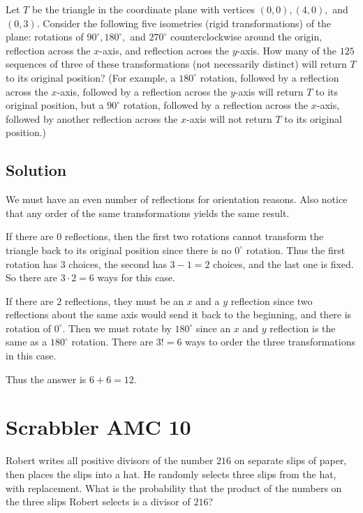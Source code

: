 \documentclass[mast]{lucky}
\begin{document}
Let $T$ be the triangle in the coordinate plane with vertices $(0,0), (4,0),$ and $(0,3).$ Consider the following five isometries (rigid transformations) of the plane: rotations of $90^{\circ}, 180^{\circ},$ and $270^{\circ}$ counterclockwise around the origin, reflection across the $x$-axis, and reflection across the $y$-axis. How many of the $125$ sequences of three of these transformations (not necessarily distinct) will return $T$ to its original position? (For example, a $180^{\circ}$ rotation, followed by a reflection across the $x$-axis, followed by a reflection across the $y$-axis will return $T$ to its original position, but a $90^{\circ}$ rotation, followed by a reflection across the $x$-axis, followed by another reflection across the $x$-axis will not return $T$ to its original position.)

\subsection{Solution}
We must have an even number of reflections for orientation reasons. Also notice that any order of the same transformations yields the same result.
    
If there are $0$ reflections, then the first two rotations cannot transform the triangle back to its original position since there is no $0^{\circ}$ rotation. Thus the first rotation has $3$ choices, the second has $3-1=2$ choices, and the last one is fixed. So there are $3\cdot 2=6$ ways for this case.
    
If there are $2$ reflections, they must be an $x$ and a $y$ reflection since two reflections about the same axis would send it back to the beginning, and there is rotation of $0^{\circ}.$ Then we must rotate by $180^{\circ}$ since an $x$ and $y$ reflection is the same as a $180^{\circ}$ rotation. There are $3!=6$ ways to order the three transformations in this case.
    
Thus the answer is $6+6=12.$

\pagebreak\section{Scrabbler AMC 10}

Robert writes all positive divisors of the number $216$ on separate slips of paper, then places the slips into a hat. He randomly selects three slips from the hat, with replacement. What is the probability that the product of the numbers on the three slips Robert selects is a divisor of $216$?
\end{document}
